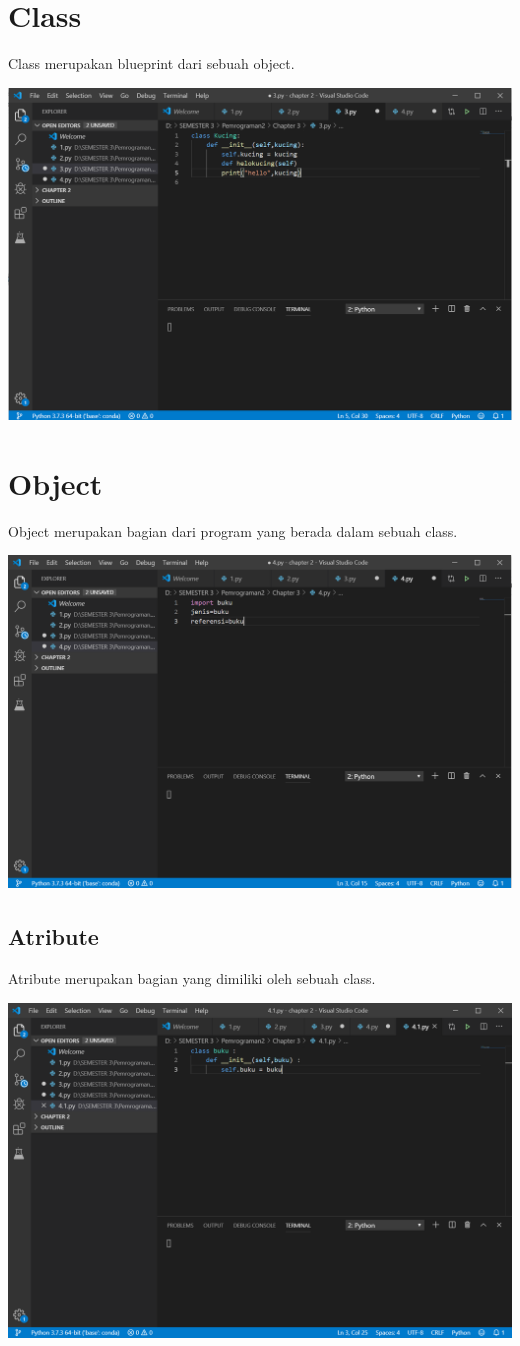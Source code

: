 \documentclass{article}
\begin{document}
\section{Class}
Class merupakan blueprint dari sebuah object.
\begin{center}
    \includegraphics[width=.8\textwidth]{keterampilan/3.PNG}
\end{center}

\section{Object}
Object merupakan bagian dari program yang berada dalam sebuah class.
\begin{center}
    \includegraphics[width=.8\textwidth]{keterampilan/4.PNG}
\end{center}

\subsection{Atribute}
Atribute merupakan bagian yang dimiliki oleh sebuah class.
\begin{center}
    \includegraphics[width=.8\textwidth]{keterampilan/4.1.PNG}
\end{center}
\end{document}
